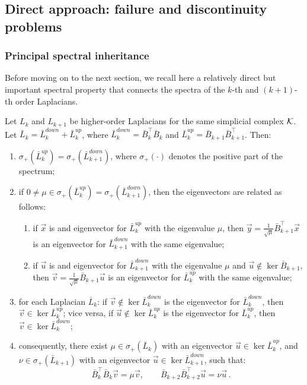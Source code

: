 \subsection{Direct approach: failure and discontinuity problems }


\subsubsection{Principal spectral inheritance}


Before moving on to the next section, we recall here a relatively direct  but important spectral property that connects the spectra of the $k$-th and $(k+1)$-th order Laplacians. 

\begin{theorem}\label{thm:inherit}
  Let $L_k$ and $L_{k+1}$ be  higher-order Laplacians for the same simplicial complex $\mathcal{K}$. Let $\bar L_k=\bar L_k^{down}+\bar L_k^{up}$, where $\bar L_k^{down}=\bar B_k^\top \bar B_k$ and $\bar L_k^{up}=\bar B_{k+1} \bar B_{k+1}^\top$. Then:
  \begin{enumerate}
    \item $\sigma_+(\bar L_k^{up})=\sigma_+(\bar L_{k+1}^{down})$, where $\sigma_+(\cdot)$ denotes the positive part of the spectrum;
    \item if $ 0 \ne \mu \in \sigma_+(\bar L_k^{up}) = \sigma_+(\bar L_{k+1}^{down})$, then the eigenvectors are related as follows:
    \begin{enumerate}
      \item if $\vec x$ is and eigenvector for $\bar L_k^{up}$ with the eigenvalue $\mu$, then $\vec y = \frac{1}{\sqrt{\mu}} \bar B_{k+1}^\top \vec x$ is an eigenvector for $\bar L_{k+1}^{down}$ with the same eigenvalue;
      \item if $\vec u$ is and eigenvector for $\bar L_{k+1}^{down}$ with the eigenvalue $\mu$ and $\vec u \notin \ker \bar B_{k+1}$, then $\vec v = \frac{1}{\sqrt{\mu}} \bar B_{k+1} \vec u$ is an eigenvector for $\bar L_{k}^{up}$ with the same eigenvalue;
    \end{enumerate}
    \item for each Laplacian $\bar L_k$: if $\vec v \notin \ker \bar L_k^{down}$ is the eigenvector for $\bar L_k^{down}$, then $\vec v \in \ker \bar L_{k}^{up}$; vice versa, if $\vec u \notin \ker \bar L_k^{up}$ is the eigenvector for $\bar L_k^{up}$, then $\vec v \in \ker \bar L_k^{down}$;
    \item consequently, there exist $\mu \in \sigma_+(\bar L_k)$ with an eigenvector $\vec u \in \ker \bar L_k^{up}$, and $\nu \in \sigma_+(\bar L_{k+1})$ with an eigenvector $\vec u \in \ker \bar L_{k+1}^{down}$, such that:
    $$
    \bar B_k^\top \bar B_k \vec v  = \mu \vec v, \qquad \bar B_{k+2} \bar B_{k+2}^\top \vec u = \nu \vec u\, . 
    $$
  \end{enumerate}
\end{theorem}
